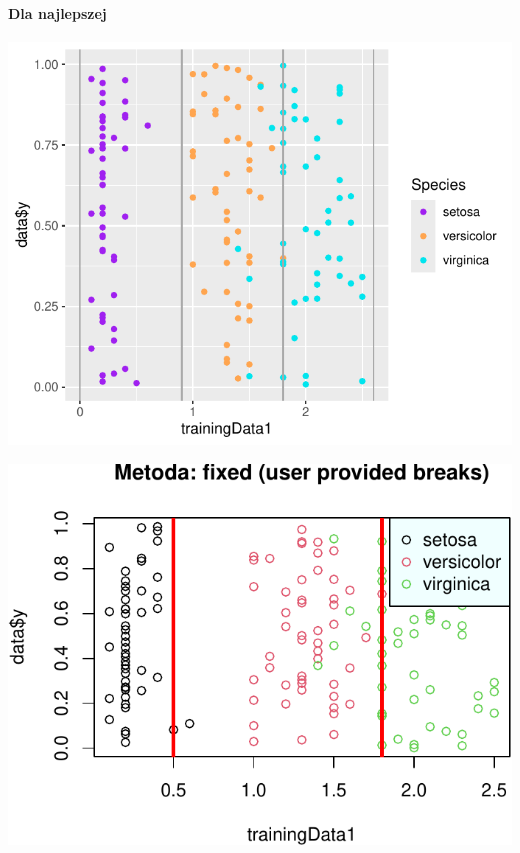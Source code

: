 \documentclass[
  12pt,
]{article}
\begin{document}
\paragraph{Dla najlepszej}\label{dla-najlepszej-3}

\begin{center}\includegraphics{Sprawozdanie2_files/figure-latex/givenRanges_najl-1} \end{center}

\begin{center}\includegraphics{Sprawozdanie2_files/figure-latex/givenRanges_najl-2} \end{center}
\end{document}
